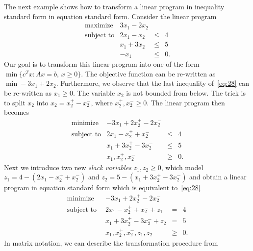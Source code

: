 The next example shows how to transform a linear program in inequality
standard form in equation standard form.  Consider the linear program 
\begin{equation}
\label{eq:28}
  \begin{array}{lrcl}
    \text{maximize}   & 3 x_1 - 2x_2 \\
    \text{subject to} & 2x_1 - x_2 & \leq & 4 \\
                      & x_1 + 3x_2 & \leq & 5 \\
                      & -x_1 & \leq & 0.     
  \end{array}
\end{equation}
Our goal is to transform this linear program into one of the form
$\min\{c^Tx \colon Ax = b, \, x\geq0\}$.  The objective function can be
re-written as $\min -3x_1 + 2x_2$.  Furthermore, we observe that the
last inequality of~\eqref{eq:28} can be re-written as $x_1\geq0$. The
variable $x_2$ is not bounded from below. The trick is to split $x_2$
into $x_2 = x_2^+ - x_2^-$, where $x_2^+,x_2^- \geq0$. The linear
program then becomes 
\begin{equation}
  \label{eq:29}
  \begin{array}{llcl}
    \text{minimize}   & -3 x_1 + 2x_2^+ -2 x_2^- \\
    \text{subject to} & 2x_1 - x_2^+ + x_2^- & \leq & 4 \\
                      & x_1 + 3x_2^+ -3 x_2^- & \leq & 5 \\
                      & x_1, x_2^+,x_2^- &\geq &0.
  \end{array}
\end{equation}
Next we introduce two new \emph{slack variables} $z_1,z_2\geq0$, which
model $z_1 = 4- (2x_1 - x_2^+ + x_2^-)$ and $z_2 = 5 - (x_1 + 3x_2^+
-3 x_2^-)$ and obtain a linear program in equation
standard form which is equivalent to~\eqref{eq:28} 
\begin{displaymath}
  \begin{array}{llcl}
    \text{minimize }   & -3 x_1 + 2x_2^+ -2 x_2^- \\
    \text{subject to }\, & 2x_1 - x_2^+ + x_2^- + z_1 & = & 4 \\
                      & x_1 + 3x_2^+ -3 x_2^- + z_2  & = & 5 \\
                      & x_1, x_2^+,x_2^-,z_1,z_2 & \geq &0.
  \end{array}
\end{displaymath}
%
In matrix notation, we can describe the transformation procedure from
